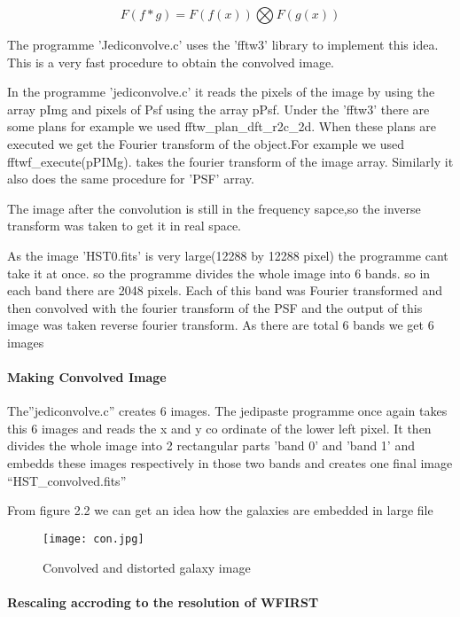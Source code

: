 \begin{equation}
F(f*g) = F(f(x))\bigotimes F(g(x))
\end{equation}


The programme 'Jediconvolve.c' uses the 'fftw3' library to implement this idea. This is a very fast procedure to obtain the convolved image.

In the programme 'jediconvolve.c' it reads the pixels of the image by using the array pImg and pixels of Psf using the array pPsf.
Under the 'fftw3' there are some plans for example we used fftw\_plan\_dft\_r2c\_2d. When these plans are executed we get the Fourier transform of the object.For example
we used fftwf\_execute(pPIMg). takes the fourier transform of the image array. Similarly it also does the same procedure for 'PSF' array.

The image after the convolution is still in the frequency sapce,so the inverse transform was taken to get it in real space.

As the image 'HST0.fits' is very large(12288 by 12288 pixel) the programme cant take it at once. so the programme divides the whole image into 6 bands. so in each band there are 2048 pixels.
Each of this band was Fourier transformed and then convolved with the fourier transform of the PSF and the output of this image was taken reverse fourier transform.
As there are total 6 bands we get 6 images


\paragraph{Making Convolved Image}

The''jediconvolve.c'' creates 6 images. The jedipaste programme once again takes this 6 images and reads the x and y co ordinate of the lower left pixel.
It then divides the whole image into  2 rectangular parts 'band 0' and 'band 1' and embedds these images respectively in those two bands and creates one final image ``HST\_convolved.fits''


From figure 2.2  we can get an idea how the galaxies are embedded in large file


\begin{figure}[ht]
\begin{center}
\texttt{[image: con.jpg]}
\label{fig}
\caption{Convolved and distorted galaxy image}
\end{center}
\end{figure}


\paragraph{Rescaling accroding to the resolution of WFIRST}


